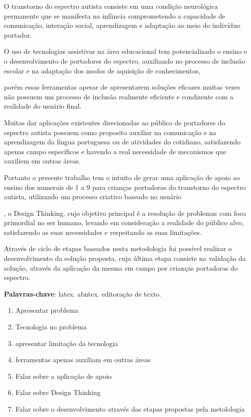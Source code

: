 \setlength{\absparsep}{18pt} %
\begin{resumo}
	O transtorno do espectro autista consiste em uma condição neurológica permanente que se manifesta na infância comprometendo a capacidade de comunicação, interação social, aprendizagem e adaptação ao meio do indivíduo portador. 

	O uso de tecnologias assistivas na área educacional tem potencializado o ensino e o desenvolvimento de portadores do espectro, auxiliando no processo de inclusão escolar e na adaptação dos modos de aquisição de conhecimentos, 

	porém essas ferramentas apesar de apresentarem soluções eficazes muitas vezes não possuem um processo de inclusão realmente eficiente e condizente com a realidade do usuário final. 

	Muitas dar aplicações existentes direcionadas ao público de portadores do espectro autista possuem como proposito auxiliar na comunicação e na aprendizagem da língua portuguesa ou de atividades do cotidiano, satisfazendo apenas campo específicos e havendo a real necessidade de mecanismos que auxiliem em outras áreas.

	Portanto o presente trabalho tem o intuito de gerar uma aplicação de apoio ao ensino dos numerais de 1 a 9 para crianças portadoras do transtorno do espectro autista, utilizando um processo criativo baseado no usuário

	, o Design Thinking, cujo objetivo principal é a resolução de problemas com foco primordial no ser humano, levando em consideração a realidade do público alvo, satisfazendo as suas necessidades e respeitando as suas limitações.  

	Através de ciclo de etapas baseados nesta metodologia foi possível realizar o desenvolvimento da solução proposta, cuja última etapa consiste na validação da solução, através da aplicação da mesma em campo por crianças portadoras do espectro.

	\textbf{Palavras-chave}: latex. abntex. editoração de texto.
	\newpage
	\begin{enumerate}
		\item Apresentar problema
		\item Tecnologia no problema
		\item apresentar limitação da tecnologia
		\item ferramentas apenas auxiliam em outras áreas
		\item Falar sobre a aplicação de apoio
		\item Falar sobre Design Thinking
		\item Falar sobre o desenvolvimento através das etapas propostas pela metolologia
	\end{enumerate}



\end{resumo}
